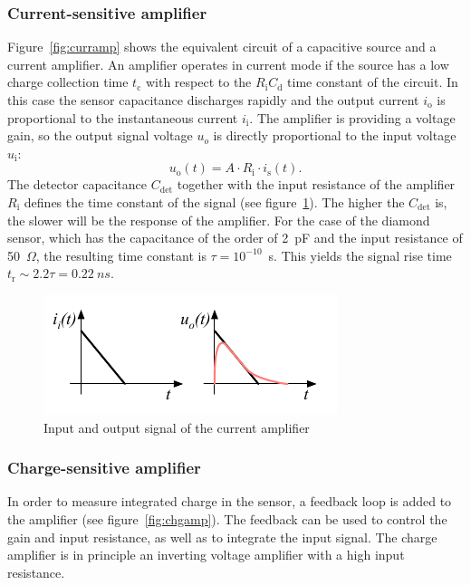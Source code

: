 \subsubsection{Current-sensitive amplifier}
Figure~\ref{fig:curramp} shows the equivalent circuit of a capacitive source and a current amplifier. An amplifier operates in current mode if the source has a low charge collection time $t_\mathrm{c}$ with respect to the $R_\mathrm{i}C_\mathrm{d}$ time constant of the circuit. In this case the sensor capacitance discharges rapidly and the output current $i_\mathrm{o}$ is proportional to the instantaneous current $i_\mathrm{i}$. The amplifier is providing a voltage gain, so the output signal voltage $u_o$ is directly proportional to the input voltage $u_\mathrm{i}$:
\begin{equation}
u_\mathrm{o}(t) = A \cdot R_\mathrm{i} \cdot i_\mathrm{s}(t).
\end{equation}
The detector capacitance $C_\mathrm{det}$ together with the input resistance of the amplifier $R_\mathrm{i}$ defines the time constant of the signal (see figure~\ref{fig:currc}). The higher the $C_\mathrm{det}$ is, the slower will be the response of the amplifier. For the case of the diamond sensor, which has the capacitance of the order of 2~pF and the input resistance of 50~$\Omega$, the resulting time constant is $\tau=10^{-10}$~s. This yields the signal rise time $t_\mathrm{r}\sim2.2\tau=0.22~ns$.
\begin{figure}[!t]
\begin{center}
\includegraphics[width=0.8\linewidth]{02_pulse_formation/pics/plots/currrc}
\caption{Input and output signal of the current amplifier}
\label{fig:currc}
\end{center}
\end{figure}




\subsubsection{Charge-sensitive amplifier}
In order to measure integrated charge in the sensor, a feedback loop is added to the amplifier (see figure~\ref{fig:chgamp}). The feedback can be used to control the gain and input resistance, as well as to integrate the input signal. The charge amplifier is in principle an inverting voltage amplifier with a high input resistance. 
 
